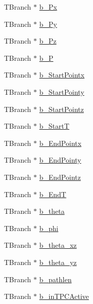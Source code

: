 \begin{DoxyCompactItemize}
\item 
T\-Branch $\ast$ \hyperlink{classanatree_ac76749a68f213e1d8dde5ce2c7e8e811}{b\-\_\-\-Px}
\item 
T\-Branch $\ast$ \hyperlink{classanatree_a3d43b3415c74db22248342ef0e592b71}{b\-\_\-\-Py}
\item 
T\-Branch $\ast$ \hyperlink{classanatree_ad9c991283dc6b579be6a58a264b005d6}{b\-\_\-\-Pz}
\item 
T\-Branch $\ast$ \hyperlink{classanatree_aecb071fd667576c8b7414a8f1ea7ed32}{b\-\_\-\-P}
\item 
T\-Branch $\ast$ \hyperlink{classanatree_aa45a25dc13a2b4ce708a270193a3f0d2}{b\-\_\-\-Start\-Pointx}
\item 
T\-Branch $\ast$ \hyperlink{classanatree_a2db436cd83b5f17a916f07c775ce0fce}{b\-\_\-\-Start\-Pointy}
\item 
T\-Branch $\ast$ \hyperlink{classanatree_abc639192c52cdbf85c2929857906c1cc}{b\-\_\-\-Start\-Pointz}
\item 
T\-Branch $\ast$ \hyperlink{classanatree_ad4ccd3d5373e12128c7512166daa3998}{b\-\_\-\-Start\-T}
\item 
T\-Branch $\ast$ \hyperlink{classanatree_a9011b8bd3d90df4d24de2fc1d4b46080}{b\-\_\-\-End\-Pointx}
\item 
T\-Branch $\ast$ \hyperlink{classanatree_a7de38448b77ece82a62f049fc1272f4f}{b\-\_\-\-End\-Pointy}
\item 
T\-Branch $\ast$ \hyperlink{classanatree_aa33e37eb87d52df5b803506bdfe09fe2}{b\-\_\-\-End\-Pointz}
\item 
T\-Branch $\ast$ \hyperlink{classanatree_a52b183a10db57477742a139d2ed6a119}{b\-\_\-\-End\-T}
\item 
T\-Branch $\ast$ \hyperlink{classanatree_a8e8c26faab89d08eb047360ab1737e5f}{b\-\_\-theta}
\item 
T\-Branch $\ast$ \hyperlink{classanatree_a785b0dfe81115f9cbf571b545d26ca88}{b\-\_\-phi}
\item 
T\-Branch $\ast$ \hyperlink{classanatree_a02d9381d25c3a77920329c803c423029}{b\-\_\-theta\-\_\-xz}
\item 
T\-Branch $\ast$ \hyperlink{classanatree_ad1cfdc33d1d125978746c0e4d4fb5679}{b\-\_\-theta\-\_\-yz}
\item 
T\-Branch $\ast$ \hyperlink{classanatree_ab602eac75025e59ccd47ca64ef07a558}{b\-\_\-pathlen}
\item 
T\-Branch $\ast$ \hyperlink{classanatree_aca9ed320bee9d0643e5da420f55e9681}{b\-\_\-in\-T\-P\-C\-Active}
\item 

\end{DoxyCompactItemize}
